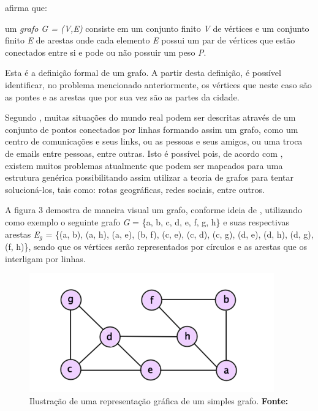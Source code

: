\par {} afirma que: 

\begin{citacao}
	um \textit{grafo G = (V,E)} consiste em um conjunto finito \textit{V} de vértices e um conjunto finito \textit{E} de arestas onde cada elemento \textit{E} possui um par de vértices que estão conectados entre si e pode ou não possuir um peso \textit{P}.
\end{citacao}

\par Esta é a definição formal de um grafo. A partir desta definição, é possível identificar, no problema mencionado anteriormente, os vértices que neste caso são as pontes e as arestas que por sua vez são as partes da cidade.

\par Segundo , muitas situações do mundo real podem ser descritas através de um conjunto de pontos conectados por linhas formando assim um grafo, como um centro de comunicações e seus links, ou as pessoas e seus amigos, ou uma troca de emails entre pessoas, entre outras. Isto é possível pois, de acordo com , existem muitos problemas atualmente que podem ser mapeados para uma estrutura genérica possibilitando assim utilizar a teoria de grafos para tentar solucioná-los, tais como: rotas geográficas, redes sociais, entre outros.

\par A figura 3 demostra de maneira visual um grafo, conforme ideia de , utilizando como exemplo o seguinte grafo \textit{G} = \{a, b, c, d, e, f, g, h\} e suas respectivas arestas \textit{E}$_g$ = \{(a, b), (a, h), (a, e), (b, f), (c, e), (c, d), (c, g), (d, e), (d, h), (d, g), (f, h)\}, sendo que os vértices serão representados por círculos e as arestas que os interligam por linhas.


\begin{figure}[h!]
	\centerline{\includegraphics[scale=0.77]{./imagens/simple_graph.png}}
	\caption[Ilustração de uma representação gráfica de um simples grafo]
	{Ilustração de uma representação gráfica de um simples grafo. \textbf{Fonte:} }
	\label{fig:exemplo1}
\end{figure}


